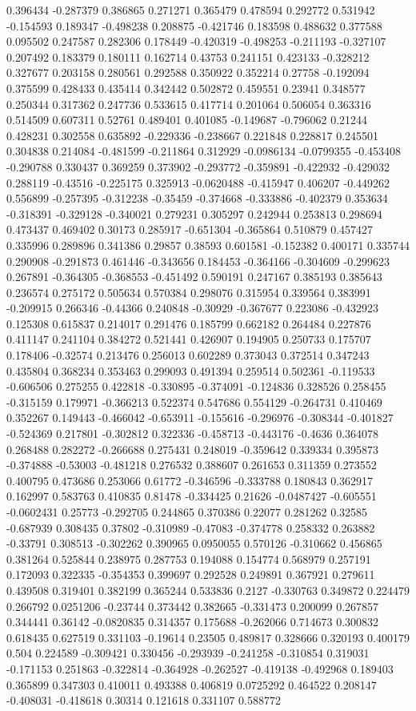 0.396434 -0.287379 0.386865 0.271271 0.365479 0.478594 0.292772 0.531942 -0.154593 0.189347 -0.498238 0.208875 -0.421746 0.183598 0.488632 0.377588 0.095502 0.247587 0.282306 0.178449 -0.420319 -0.498253 -0.211193 -0.327107 0.207492 0.183379 0.180111 0.162714 0.43753 0.241151 0.423133 -0.328212 0.327677 0.203158 0.280561 0.292588 0.350922 0.352214 0.27758 -0.192094 0.375599 0.428433 0.435414 0.342442 0.502872 0.459551 0.23941 0.348577 0.250344 0.317362 0.247736 0.533615 0.417714 0.201064 0.506054 0.363316 0.514509 0.607311 0.52761 0.489401 0.401085 -0.149687 -0.796062 0.21244 0.428231 0.302558 0.635892 -0.229336 -0.238667 0.221848 0.228817 0.245501 0.304838 0.214084 -0.481599 -0.211864 0.312929 -0.0986134 -0.0799355 -0.453408 -0.290788 0.330437 0.369259 0.373902 -0.293772 -0.359891 -0.422932 -0.429032 0.288119 -0.43516 -0.225175 0.325913 -0.0620488 -0.415947 0.406207 -0.449262 0.556899 -0.257395 -0.312238 -0.35459 -0.374668 -0.333886 -0.402379 0.353634 -0.318391 -0.329128 -0.340021 0.279231 0.305297 0.242944 0.253813 0.298694 0.473437 0.469402 0.30173 0.285917 -0.651304 -0.365864 0.510879 0.457427 0.335996 0.289896 0.341386 0.29857 0.38593 0.601581 -0.152382 0.400171 0.335744 0.290908 -0.291873 0.461446 -0.343656 0.184453 -0.364166 -0.304609 -0.299623 0.267891 -0.364305 -0.368553 -0.451492 0.590191 0.247167 0.385193 0.385643 0.236574 0.275172 0.505634 0.570384 0.298076 0.315954 0.339564 0.383991 -0.209915 0.266346 -0.44366 0.240848 -0.30929 -0.367677 0.223086 -0.432923 0.125308 0.615837 0.214017 0.291476 0.185799 0.662182 0.264484 0.227876 0.411147 0.241104 0.384272 0.521441 0.426907 0.194905 0.250733 0.175707 0.178406 -0.32574 0.213476 0.256013 0.602289 0.373043 0.372514 0.347243 0.435804 0.368234 0.353463 0.299093 0.491394 0.259514 0.502361 -0.119533 -0.606506 0.275255 0.422818 -0.330895 -0.374091 -0.124836 0.328526 0.258455 -0.315159 0.179971 -0.366213 0.522374 0.547686 0.554129 -0.264731 0.410469 0.352267 0.149443 -0.466042 -0.653911 -0.155616 -0.296976 -0.308344 -0.401827 -0.524369 0.217801 -0.302812 0.322336 -0.458713 -0.443176 -0.4636 0.364078 0.268488 0.282272 -0.266688 0.275431 0.248019 -0.359642 0.339334 0.395873 -0.374888 -0.53003 -0.481218 0.276532 0.388607 0.261653 0.311359 0.273552 0.400795 0.473686 0.253066 0.61772 -0.346596 -0.333788 0.180843 0.362917 0.162997 0.583763 0.410835 0.81478 -0.334425 0.21626 -0.0487427 -0.605551 -0.0602431 0.25773 -0.292705 0.244865 0.370386 0.22077 0.281262 0.32585 -0.687939 0.308435 0.37802 -0.310989 -0.47083 -0.374778 0.258332 0.263882 -0.33791 0.308513 -0.302262 0.390965 0.0950055 0.570126 -0.310662 0.456865 0.381264 0.525844 0.238975 0.287753 0.194088 0.154774 0.568979 0.257191 0.172093 0.322335 -0.354353 0.399697 0.292528 0.249891 0.367921 0.279611 0.439508 0.319401 0.382199 0.365244 0.533836 0.2127 -0.330763 0.349872 0.224479 0.266792 0.0251206 -0.23744 0.373442 0.382665 -0.331473 0.200099 0.267857 0.344441 0.36142 -0.0820835 0.314357 0.175688 -0.262066 0.714673 0.300832 0.618435 0.627519 0.331103 -0.19614 0.23505 0.489817 0.328666 0.320193 0.400179 0.504 0.224589 -0.309421 0.330456 -0.293939 -0.241258 -0.310854 0.319031 -0.171153 0.251863 -0.322814 -0.364928 -0.262527 -0.419138 -0.492968 0.189403 0.365899 0.347303 0.410011 0.493388 0.406819 0.0725292 0.464522 0.208147 -0.408031 -0.418618 0.30314 0.121618 0.331107 0.588772 